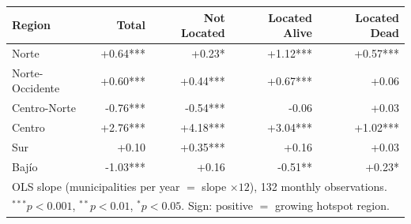 \begin{tabular}{lrrrr}
  \toprule
  \textbf{Region} & \textbf{Total} & \textbf{Not Located} & \textbf{Located Alive} & \textbf{Located Dead} \\
  \midrule
  Norte & +0.64*** & +0.23* & +1.12*** & +0.57*** \\
  Norte-Occidente & +0.60*** & +0.44*** & +0.67*** & +0.06 \\
  Centro-Norte & -0.76*** & -0.54*** & -0.06 & +0.03 \\
  Centro & +2.76*** & +4.18*** & +3.04*** & +1.02*** \\
  Sur & +0.10 & +0.35*** & +0.16 & +0.03 \\
  Bajío & -1.03*** & +0.16 & -0.51** & +0.23* \\
  \bottomrule
  \multicolumn{5}{l}{\footnotesize OLS slope (municipalities per year $= $ slope $\times 12$), 132 monthly observations.} \\
  \multicolumn{5}{l}{\footnotesize $^{***}p<0.001$, $^{**}p<0.01$, $^{*}p<0.05$. Sign: positive $=$ growing hotspot region.} \\
\end{tabular}